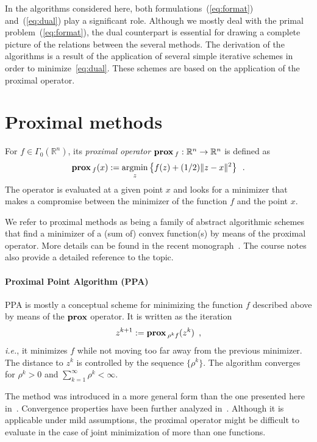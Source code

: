 \documentclass[openany]{now}
\newcommand{\ie}{{\it i.e.}}
\newcommand{\reals}{{\mathbb R}}
\newcommand{\argmin}{\mathop{\rm argmin}}
\newcommand{\prox}{\mathop{\bf prox}}
\begin{document}
In the algorithms considered here, both formulations~(\ref{eq:format}) and~(\ref{eq:dual}) play a significant role. Although we mostly deal with the primal problem~(\ref{eq:format}), the dual counterpart is essential for drawing a complete picture of the relations between the several methods. The derivation of the algorithms is a result of the application of several simple iterative schemes in order to minimize~\eqref{eq:dual}. These schemes are based on the application of the proximal operator.


\section{Proximal methods}
For $f\in \Gamma_0(\reals^n)$, its \emph{proximal operator} $\prox{_{f}}:\reals^n\rightarrow\reals^n$ is defined as
\[
  \prox{_{f}}(x):= \argmin\limits_{z} \left\{f(z)+(1/2)\|z-x\|^2\right\}\enspace.
\]
The operator is evaluated at a given point $x$ and looks for a minimizer that makes a compromise between the minimizer of the function $f$ and the point $x$. 

We refer to proximal methods as being a family of abstract algorithmic schemes that find a minimizer of a (sum of) convex function(s) by means of the proximal operator. More details can be found in the recent monograph~\cite{parikh2014proximal}. The course notes~\cite{EE_236C} also provide a detailed reference to the topic.

\paragraph{Proximal Point Algorithm (PPA)} PPA is mostly a conceptual scheme for minimizing the function $f$ described above by means of the $\prox$ operator. It is written as the iteration
\begin{equation}{\label{ch2::eq:PPA}}
 z^{k+1} :=  \prox{_{\rho^kf}}(z^k)\enspace,
\end{equation}
\ie, it minimizes $f$ while not moving too far away from the previous minimizer. The distance to $z^k$ is controlled by the sequence $\{\rho^k\}$. The algorithm converges for $\rho^k>0$ and $\sum_{k=1}^{\infty}\rho^k<\infty$.

The method was introduced in a more general form than the one presented here in~\cite{Rockafellar_ppa}. Convergence properties have been further analyzed in~\cite{Guler:1991:CPP:104219.104233}. Although it is applicable under mild assumptions, the proximal operator might be difficult to evaluate in the case of joint minimization of more than one functions. 
\end{document}
